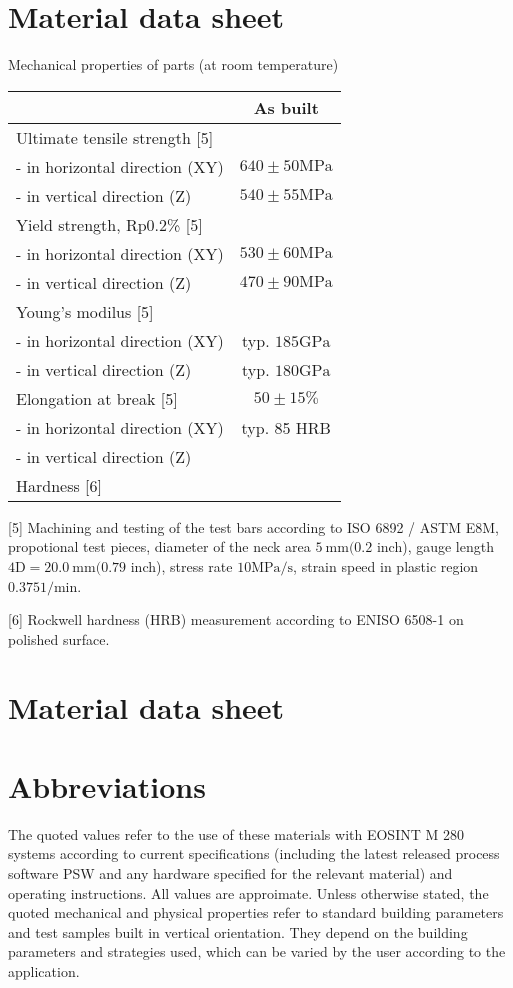 \documentclass[10pt]{article}
\begin{document}
\section*{Material data sheet}
Mechanical properties of parts (at room temperature)

\begin{center}
\begin{tabular}{lc}
\hline
 & \multicolumn{1}{c}{As built} \\
\hline
Ultimate tensile strength [5] &  \\
\cline { 2 - 2 }
- in horizontal direction (XY) & $640 \pm 50 \mathrm{MPa}$ \\
\cline { 2 - 2 }
- in vertical direction (Z) & $540 \pm 55 \mathrm{MPa}$ \\
\hline
Yield strength, Rp0.2\% [5] &  \\
\cline { 2 - 2 }
- in horizontal direction (XY) & $530 \pm 60 \mathrm{MPa}$ \\
\cline { 2 - 2 }
- in vertical direction (Z) & $470 \pm 90 \mathrm{MPa}$ \\
\hline
Young's modilus [5] &  \\
\cline { 2 - 2 }
- in horizontal direction (XY) & typ. $185 \mathrm{GPa}$ \\
- in vertical direction (Z) & typ. $180 \mathrm{GPa}$ \\
\hline
Elongation at break [5] & $50 \pm 15 \%$ \\
\hline
- in horizontal direction (XY) & typ. 85 HRB \\
\hline
- in vertical direction (Z) &  \\
\hline
Hardness [6] &  \\
\hline
\end{tabular}
\end{center}

[5] Machining and testing of the test bars according to ISO 6892 / ASTM E8M, propotional test pieces, diameter of the neck area $5 \mathrm{~mm}(0.2$ inch), gauge length $4 \mathrm{D}=20.0 \mathrm{~mm}(0.79$ inch), stress rate $10 \mathrm{MPa} / \mathrm{s}$, strain speed in plastic region $0.3751 / \mathrm{min}$.

[6] Rockwell hardness (HRB) measurement according to ENISO 6508-1 on polished surface.

\section*{Material data sheet }
\section*{Abbreviations}
The quoted values refer to the use of these materials with EOSINT M 280 systems according to current specifications (including the latest released process software PSW and any hardware specified for the relevant material) and operating instructions. All values are approimate. Unless otherwise stated, the quoted mechanical and physical properties refer to standard building parameters and test samples built in vertical orientation. They depend on the building parameters and strategies used, which can be varied by the user according to the application.
\end{document}
